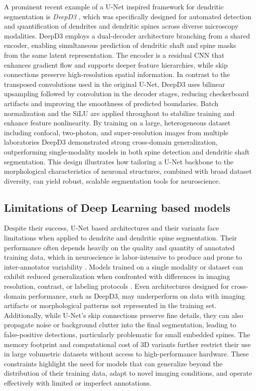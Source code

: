 A prominent recent example of a U-Net inspired framework for dendritic segmentation is \textit{\gls{DeepD3}} \cite{Fernholz_2024}, which was specifically designed for automated detection and quantification of dendrites and dendritic spines across diverse microscopy modalities. \gls{DeepD3} employs a dual-decoder architecture branching from a shared encoder, enabling simultaneous prediction of dendritic shaft and spine masks from the same latent representation. The encoder is a residual \gls{CNN} that enhances gradient flow and supports deeper feature hierarchies, while skip connections preserve high-resolution spatial information. In contrast to the transposed convolutions used in the original U-Net, \gls{DeepD3} uses bilinear upsampling followed by convolution in the decoder stages, reducing checkerboard artifacts and improving the smoothness of predicted boundaries. Batch normalization and the \gls{SiLU} are applied throughout to stabilize training and enhance feature nonlinearity. By training on a large, heterogeneous dataset including confocal, two-photon, and super-resolution images from multiple laboratories \gls{DeepD3} demonstrated strong cross-domain generalization, outperforming single-modality models in both spine detection and dendritic shaft segmentation. This design illustrates how tailoring a U-Net backbone to the morphological characteristics of neuronal structures, combined with broad dataset diversity, can yield robust, scalable segmentation tools for neuroscience.


\subsection{Limitations of Deep Learning based models}
Despite their success, U-Net based architectures and their variants face limitations when applied to dendrite and dendritic spine segmentation. Their performance often depends heavily on the quality and quantity of annotated training data, which in neuroscience is labor-intensive to produce and prone to inter-annotator variability \cite{Okabe_2020}. Models trained on a single modality or dataset can exhibit reduced generalization when confronted with differences in imaging resolution, contrast, or labeling protocols \cite{Roszkowska_2016}. Even architectures designed for cross-domain performance, such as \gls{DeepD3}, may underperform on data with imaging artifacts or morphological patterns not represented in the training set. Additionally, while U-Net’s skip connections preserve fine details, they can also propagate noise or background clutter into the final segmentation, leading to false-positive detections, particularly problematic for small embedded spines. The memory footprint and computational cost of 3D variants further restrict their use in large volumetric datasets without access to high-performance hardware. These constraints highlight the need for models that can generalize beyond the distribution of their training data, adapt to novel imaging conditions, and operate effectively with limited or imperfect annotations.

